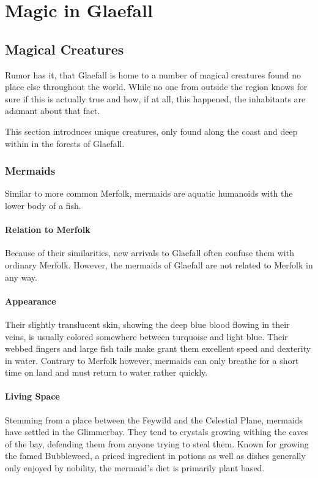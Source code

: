 \chapter{Magic in Glaefall}

\section{Magical Creatures}

Rumor has it, that Glaefall is home to a number of magical creatures found no place else throughout the world.
While no one from outside the region knows for sure if this is actually true and how, if at all, this happened, the inhabitants are adamant about that fact.

This section introduces unique creatures, only found along the coast and deep within in the forests of Glaefall.

\subsection{Mermaids}

Similar to more common Merfolk, mermaids are aquatic humanoids with the lower body of a fish.

\subsubsection{Relation to Merfolk}
Because of their similarities, new arrivals to Glaefall often confuse them with ordinary Merfolk.
However, the mermaids of Glaefall are not related to Merfolk in any way.

\subsubsection{Appearance}
Their slightly translucent skin, showing the deep blue blood flowing in their veins, is usually colored somewhere between turquoise and light blue.
Their webbed fingers and large fish tails make grant them excellent speed and dexterity in water.
Contrary to Merfolk however, mermaids can only breathe for a short time on land and must return to water rather quickly.

\subsubsection{Living Space}
Stemming from a place between the Feywild and the Celestial Plane, mermaids have settled in the Glimmerbay.
They tend to crystals growing withing the caves of the bay, defending them from anyone trying to steal them.
Known for growing the famed Bubbleweed, a priced ingredient in potions as well as dishes generally only enjoyed by nobility, the mermaid's diet is primarily plant based.


